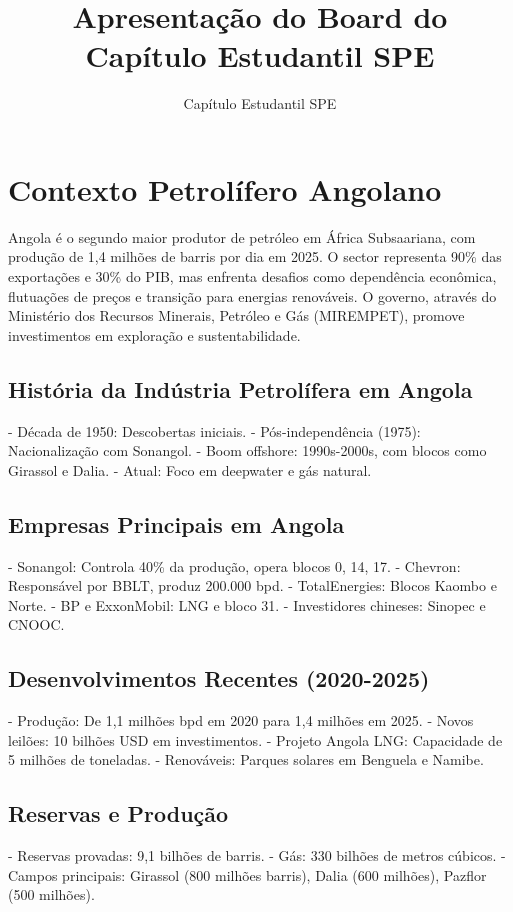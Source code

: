 \documentclass[12pt]{article}
\title{Apresentação do Board do Capítulo Estudantil SPE}
\author{Capítulo Estudantil SPE}
\date{}
\begin{document}
\maketitle

\section{Contexto Petrolífero Angolano}

Angola é o segundo maior produtor de petróleo em África Subsaariana, com produção de 1,4 milhões de barris por dia em 2025. O sector representa 90\% das exportações e 30\% do PIB, mas enfrenta desafios como dependência econômica, flutuações de preços e transição para energias renováveis. O governo, através do Ministério dos Recursos Minerais, Petróleo e Gás (MIREMPET), promove investimentos em exploração e sustentabilidade.

\subsection{História da Indústria Petrolífera em Angola}
- Década de 1950: Descobertas iniciais.
- Pós-independência (1975): Nacionalização com Sonangol.
- Boom offshore: 1990s-2000s, com blocos como Girassol e Dalia.
- Atual: Foco em deepwater e gás natural.

\subsection{Empresas Principais em Angola}
- Sonangol: Controla 40\% da produção, opera blocos 0, 14, 17.
- Chevron: Responsável por BBLT, produz 200.000 bpd.
- TotalEnergies: Blocos Kaombo e Norte.
- BP e ExxonMobil: LNG e bloco 31.
- Investidores chineses: Sinopec e CNOOC.

\subsection{Desenvolvimentos Recentes (2020-2025)}
- Produção: De 1,1 milhões bpd em 2020 para 1,4 milhões em 2025.
- Novos leilões: 10 bilhões USD em investimentos.
- Projeto Angola LNG: Capacidade de 5 milhões de toneladas.
- Renováveis: Parques solares em Benguela e Namibe.

\subsection{Reservas e Produção}
- Reservas provadas: 9,1 bilhões de barris.
- Gás: 330 bilhões de metros cúbicos.
- Campos principais: Girassol (800 milhões barris), Dalia (600 milhões), Pazflor (500 milhões).
\end{document}
